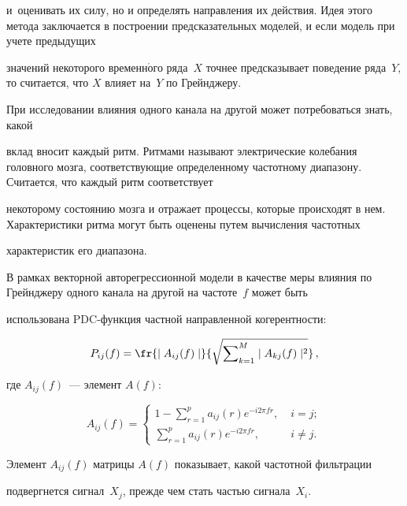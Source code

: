 и~оценивать их силу, но и определять  направления их действия. Идея этого метода заключается в построении предсказательных моделей, и если модель при учете предыдущих


значений некоторого временн$\acute{\mbox{о}}$го ряда~$X$ точнее предсказывает поведение ряда~$Y$, то считается, что $X$ влияет на~$Y$ по Грейнджеру.





При исследовании влияния одного канала на другой может потребоваться знать, какой


вклад вносит каждый ритм. Ритмами называют электрические колебания головного мозга, соответствующие определенному частотному диапазону. Считается, что каждый ритм соответствует


некоторому состоянию мозга и отражает процессы, которые происходят в нем. Характеристики ритма могут быть оценены путем вычисления частотных


характеристик его диапазона.





В рамках векторной авторегрессионной модели в качестве меры влияния по Грейнджеру одного канала на другой на частоте~$f$ может быть


использована PDC-функ\-ция частной направленной когерентности:


$$


P_{ij}(f) = \fr{\mid A_{ij}(f)\mid}{\sqrt{\sum\nolimits_{k=1}^M \mid A_{kj}(f)\mid ^2}}\,,


$$


где  $A_{ij}(f)$~--- элемент $A(f)$:


$$


A_{ij}(f) =


\left\{\begin{aligned}


    \displaystyle 1 - \sum\limits_{r=1}^p a_{ij}(r)e^{-i2{\pi}fr}, \; & i=j; \\


\displaystyle       \sum\limits_{r=1}^p a_{ij}(r)e^{-i2{\pi}fr}, \; & i \neq j.


\end{aligned}\right.


$$


%


Элемент $ A_{ij}(f) $ матрицы $A(f)$ показывает, какой частотной фильтрации


подвергнется сигнал~$X_{j}$, прежде чем стать частью сигнала~$X_{i}$.


